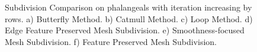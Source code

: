 \documentclass[10pt, conference, compsocconf]{IEEEtran}
\begin{document}
\begin{figure}[htbp]
  \caption{Subdivision Comparison on phalangeals with iteration increasing by rows. a) Butterfly Method. b) Catmull Method. c) Loop Method. d) Edge Feature Preserved Mesh Subdivision. e) Smoothness-focused Mesh Subdivision. f) Feature Preserved Mesh Subdivision.}\label{Figure_KFPMS_1}
\end{figure}



\begin{figure}[htbp]
  \centering

\end{figure}
\end{document}
